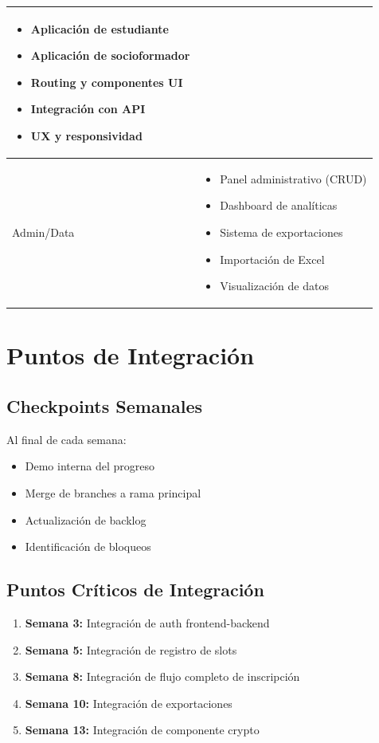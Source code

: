 \documentclass[12pt,a4paper]{article}
\begin{document}
\begin{table}[h]
\begin{tabular}{@{}lp{10cm}@{}}
\begin{itemize}[leftmargin=*, nosep]
    \item Aplicación de estudiante
    \item Aplicación de socioformador
    \item Routing y componentes UI
    \item Integración con API
    \item UX y responsividad
\end{itemize} \\
\midrule
Admin/Data & 
\begin{itemize}[leftmargin=*, nosep]
    \item Panel administrativo (CRUD)
    \item Dashboard de analíticas
    \item Sistema de exportaciones
    \item Importación de Excel
    \item Visualización de datos
\end{itemize} \\
\bottomrule
\end{tabular}
\end{table}

\section{Puntos de Integración}

\subsection{Checkpoints Semanales}

Al final de cada semana:

\begin{itemize}[leftmargin=*]
    \item Demo interna del progreso
    \item Merge de branches a rama principal
    \item Actualización de backlog
    \item Identificación de bloqueos
\end{itemize}

\subsection{Puntos Críticos de Integración}

\begin{enumerate}
    \item \textbf{Semana 3:} Integración de auth frontend-backend
    \item \textbf{Semana 5:} Integración de registro de slots
    \item \textbf{Semana 8:} Integración de flujo completo de inscripción
    \item \textbf{Semana 10:} Integración de exportaciones
    \item \textbf{Semana 13:} Integración de componente crypto
\end{enumerate}
\end{document}
